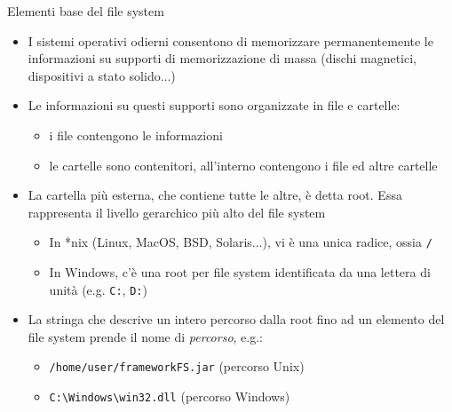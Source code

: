 \documentclass[xcolor=dvipsnames,presentation]{beamer}
\begin{document}
\begin{frame}{Elementi base del file system}
  \begin{itemize}
    \item I sistemi operativi odierni consentono di memorizzare permanentemente le informazioni su
supporti di memorizzazione di massa (dischi magnetici, dispositivi a stato solido...)
    \item Le informazioni su questi supporti sono organizzate in file e cartelle:
      \begin{itemize}
        \item i file contengono le informazioni
        \item le cartelle sono contenitori, all'interno contengono i file ed altre cartelle
      \end{itemize}
    \item La cartella più esterna, che contiene tutte le altre, è detta root. Essa rappresenta il livello gerarchico più alto del file system
      \begin{itemize}
        \item In *nix (Linux, MacOS, BSD, Solaris...), vi è una unica radice, ossia \texttt{/}
        \item In Windows, c'è una root per file system identificata da una lettera di unità (e.g.
\texttt{C:}, \texttt{D:})
      \end{itemize}
    \item La stringa che descrive un intero percorso dalla root fino ad un elemento del file system
prende il nome di \emph{percorso}, e.g.:
    \begin{itemize}
        \item \texttt{/home/user/frameworkFS.jar} (percorso Unix)
        \item \texttt{C:\textbackslash{}Windows\textbackslash{}win32.dll} (percorso Windows)
    \end{itemize}
  \end{itemize}
\end{frame}
\end{document}
